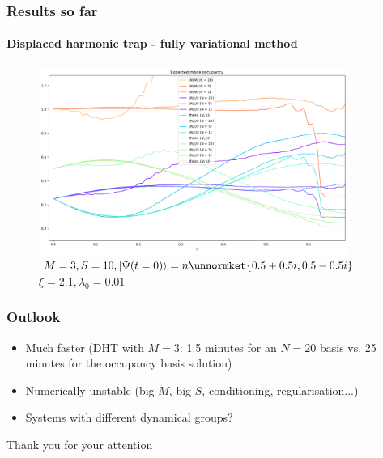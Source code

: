 \documentclass[english]{beamer}
\begin{document}
  \begin{frame}
  	\frametitle{Results so far}
  	\framesubtitle{Displaced harmonic trap - fully variational method}
  	\begin{figure}
	\centering
    		\includegraphics[width=0.9\textwidth]{images/DHT_M=3}
    		\caption{$M=3, S=10, \ket{\Psi(t=0)}=n\unnormket{0.5+0.5i,0.5-0.5i}$. $\xi=2.1, \lambda_0=0.01$}
    		\label{fig:DHT3}
	\end{figure}
  \end{frame}
  
  \begin{frame}
  	\frametitle{Outlook}
  	\begin{itemize}
  		\item Much faster (DHT with $M=3$: 1.5 minutes for an $N=20$ basis vs. 25 minutes for the occupancy basis solution)
  		\item Numerically unstable (big $M$, big $S$, conditioning, regularisation...)
  		\item Systems with different dynamical groups?
  	\end{itemize}
  \end{frame}
  
  \begin{frame}[plain,c]
  	\begin{center}
  	  \Huge Thank you for your attention
  	\end{center}
  \end{frame}
\end{document}
